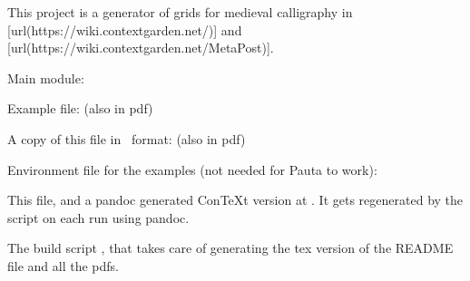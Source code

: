 \startchapter[title={A Calligraphy Grid in ConTeXt/LMTX},reference={a-calligraphy-grid-in-contextlmtx}]

This project is a generator of grids for medieval calligraphy in [url(https://wiki.contextgarden.net/)] and \goto{\MetaPost}[url(https://wiki.contextgarden.net/MetaPost)].

\startsection[title={Files included},reference={files-included}]

\startitemize[packed]
\item
  Main module:\crlf
\item
  Example file:\crlf
   (also in pdf)
\item
  A copy of this file in \ConTeXt~format:\crlf
   (also in pdf)
\item
  Environment file for the examples (not needed for Pauta to work):\crlf
\item
  This  file, and a pandoc generated ConTeXt version at . It gets regenerated by the  script on each run using pandoc.
\item
  The build script , that takes care of generating the tex version of the README file and all the pdfs.
\stopitemize

\stopsection

\startsection[title={Use},reference={use}]

